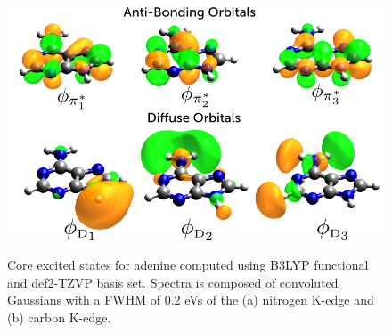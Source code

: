 \documentclass[12pt]{article}
\begin{document}
\begin{figure}[!ht]
\centering
\includegraphics[scale=0.50]{AdenineVirtuals.png} \\
\caption{Core excited states for adenine computed using B3LYP functional and def2-TZVP basis set. Spectra is composed of convoluted Gaussians with a FWHM of 0.2 eVs of the (a) nitrogen K-edge and (b) carbon K-edge.}
\label{figure:Adenine} 
\end{figure}
\end{document}
